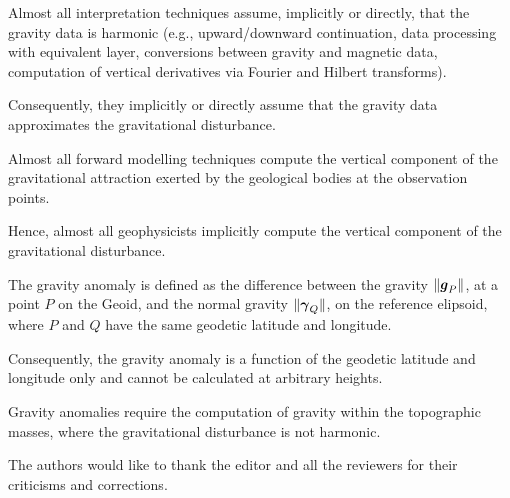 \documentclass[extra]{gji}
\begin{document}
Almost all interpretation techniques assume, implicitly or
directly, that the gravity data is harmonic (e.g., 
upward/downward continuation, 
data processing with equivalent layer,
conversions between gravity and magnetic data,
computation of vertical derivatives via Fourier and Hilbert
transforms).


Consequently, they implicitly or directly assume that
the gravity data approximates the gravitational disturbance.


Almost all forward modelling techniques compute
the vertical component of the gravitational attraction 
exerted by the geological bodies at the observation points.


Hence, almost all geophysicists implicitly compute 
the vertical component of the gravitational disturbance.


The gravity anomaly is defined as the difference between 
the gravity $\| \mitbf{g}_{P} \|$, at a point $P$ on the
Geoid, and the normal gravity $\| \mitbf{\gamma}_{Q} \|$,
on the reference elipsoid, where $P$ and $Q$ have the same
geodetic latitude and longitude.


Consequently, the gravity anomaly is a function of
the geodetic latitude and longitude only and cannot
be calculated at arbitrary heights.


Gravity anomalies require the computation of gravity
within the topographic masses, where the gravitational
disturbance is not harmonic.


\begin{acknowledgments}
The authors would like to thank the editor and all the
reviewers for their criticisms and corrections.
\end{acknowledgments}





\appendix
%
%
%
%
\end{document}
